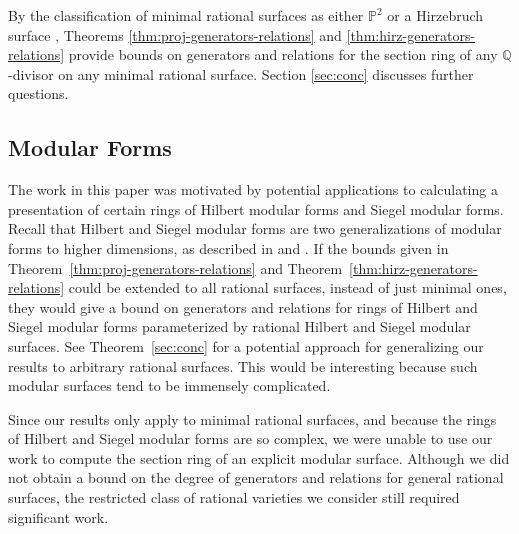 \documentclass{amsart}
\theoremstyle{plain}
\theoremstyle{definition}
\theoremstyle{remark}
\numberwithin{equation}{section}
\newcommand\bq{{\mathbb Q}}
\newcommand\bp{{\mathbb P}}
\begin{document}
\noindent
By the classification of minimal rational surfaces
as either $\bp^2$ or a Hirzebruch surface \cite{eisenbud-harris:minimal},
Theorems \ref{thm:proj-generators-relations} and
\ref{thm:hirz-generators-relations} provide bounds on generators
and relations for the section ring of any $\bq$-divisor on any
minimal rational surface. Section \ref{sec:conc} discusses further questions.

\subsection{Modular Forms}
\label{subsection:modular-forms}
The work in this paper was motivated by 
potential applications to
calculating a presentation of certain rings of
Hilbert 
modular forms and Siegel modular forms. 
Recall that Hilbert and Siegel 
modular forms are two generalizations of modular forms to higher dimensions,
as described in \cite{geer:siegel-modular} and \cite{bruinier:hilbert-modular}.
If the bounds given in 
Theorem~\ref{thm:proj-generators-relations} and Theorem~\ref{thm:hirz-generators-relations}
could be extended to all rational surfaces, instead of just minimal ones,
they would give a bound on generators and relations for 
rings of Hilbert and Siegel modular forms parameterized by rational
Hilbert and Siegel modular surfaces.
See Theorem~\ref{sec:conc} for a potential approach for generalizing our results to arbitrary rational surfaces.
This would be interesting because such modular surfaces tend to be
immensely complicated. 

Since our results only apply to minimal rational surfaces, and because the rings of Hilbert and Siegel modular forms are so complex, we were unable
to use our work to compute the section ring of an explicit modular surface.
Although we did not obtain a bound on the degree of generators and relations
for general rational surfaces, the restricted class of rational varieties we consider still required significant work.
\end{document}
